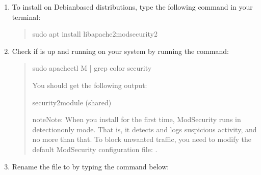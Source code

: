 \documentclass[a4paper,10pt,english,openany,oneside]{sphinxmanual}
\begin{document}
\begin{enumerate}
%
\item {} 
\sphinxAtStartPar
To install  on Debian\sphinxhyphen{}based distributions, type the following command in your terminal:
\begin{quote}

\begin{sphinxVerbatim}[commandchars=\\\{\}]
\PYGZdl{} sudo apt install lib\PYGZhy{}apache2\PYGZhy{}mod\PYGZhy{}security2
\end{sphinxVerbatim}
\end{quote}

\item {} 
\sphinxAtStartPar
Check if  is up and running on your system by running the command:
\begin{quote}

\begin{sphinxVerbatim}[commandchars=\\\{\}]
\PYGZdl{} sudo apachectl \PYGZhy{}M | grep \PYGZhy{}\PYGZhy{}color security
\end{sphinxVerbatim}

\sphinxAtStartPar
You should get the following output:

\begin{sphinxVerbatim}[commandchars=\\\{\}]
\PYGZdl{} security2\PYGZus{}module (shared)
\end{sphinxVerbatim}

\begin{sphinxadmonition}{note}{Note:}
\sphinxAtStartPar
When you install  for the first time, ModSecurity runs in detection\sphinxhyphen{}only mode. That is, it detects and logs suspicious activity, and no more than that. To block unwanted traffic, you need to modify the default ModSecurity configuration file: .
\end{sphinxadmonition}
\end{quote}

\item {} 
\sphinxAtStartPar
Rename the file  to  by typing the command below:
\begin{quote}


\end{quote}
\end{enumerate}
\end{document}
